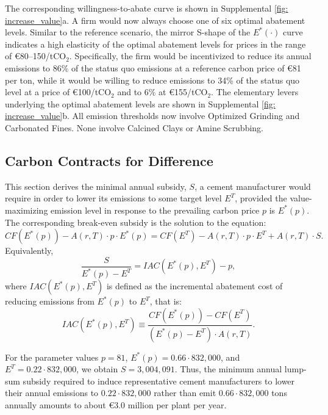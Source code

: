\documentclass[12pt, a4paper]{article} %
\newcommand{\Suppl}{Supplemental}
\begin{document}
The corresponding willingness-to-abate curve is shown in \Suppl$ $ \autoref{fig: increase_value}a. A firm would now always choose one of six optimal abatement levels. Similar to the reference scenario, the mirror S-shape of the $E^*(\cdot)$ curve indicates a high elasticity of the optimal abatement levels for prices in the range of \euro 80--150/tCO$_2$. Specifically, the firm would be incentivized to reduce its annual emissions to 86\% of the status quo emissions at a reference carbon price of \euro 81 per ton, while it would be willing to reduce emissions to 34\% of the status quo level at a price of \euro 100/tCO$_2$ and to 6\% at \euro 155/tCO$_2$. The elementary levers underlying the optimal abatement levels are shown in \Suppl$ $ \autoref{fig: increase_value}b. All emission thresholds now involve Optimized Grinding and Carbonated Fines. None involve Calcined Clays or Amine Scrubbing.

\newpage
\subsection{Carbon Contracts for Difference}
\label{sec: sn-target}

This section derives the minimal annual subsidy, $S$, a cement manufacturer would require in order to lower its emissions to some target level $E^T$, provided the value-maximizing emission level in response to the prevailing carbon price $p$ is $E^*(p)$. The corresponding break-even subsidy is the solution to the equation:
\begin{equation}
CF(E^*(p)) - A(r,T) \cdot p \cdot E^*(p) = CF(E^T) - A(r,T) \cdot p \cdot E^T + A(r, T) \cdot S.
\end{equation}
Equivalently,
\begin{equation}
\frac{S}{E^*(p) - E^T} = IAC( E^*(p), E^T) - p,
\end{equation}
where $IAC( E^*(p), E^T)$ is defined as the incremental abatement cost of reducing emissions from $E^*(p)$ to $E^T$, that is:
\begin{equation}
IAC( E^*(p), E^T) \equiv \frac{CF(E^*(p)) - CF(E^T)}{(E^*(p) - E^T) \cdot A(r,T)}.
\end{equation}

For the parameter values $p=81$, $E^*(p)= 0.66 \cdot 832,000$, and $E^T = 0.22 \cdot 832,000$, we obtain $S = 3,004,091$. Thus, the minimum annual lump-sum subsidy required to induce representative cement manufacturers to lower their annual emissions to $0.22\cdot 832,000$ rather than emit $0.66 \cdot 832,000$ tons annually amounts to about \euro 3.0 million per plant per year.
\end{document}
